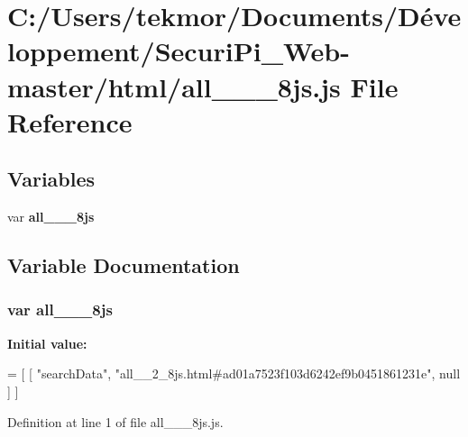 \section{C\+:/\+Users/tekmor/\+Documents/\+Développement/\+Securi\+Pi\+\_\+\+Web-\/master/html/all\+\_\+\+\_\+\_\+8js.js File Reference}
\label{all____2__8js_8js}
\subsection*{Variables}
\begin{DoxyCompactItemize}
\item 
var {\bf all\+\_\+\+\_\+\_\+8js}
\end{DoxyCompactItemize}


\subsection{Variable Documentation}
\subsubsection[{all\+\_\+\+\_\+2\+\_\+8js}]{\setlength{\rightskip}{0pt plus 5cm}var all\+\_\+\+\_\+\_\+8js}\label{all____2__8js_8js_a1931a55b1ef736d7c8f6e841ce1a5dd7}
{\bfseries Initial value\+:}
\begin{DoxyCode}
=
[
    [ \textcolor{stringliteral}{"searchData"}, \textcolor{stringliteral}{"all\_\_2\_8js.html#ad01a7523f103d6242ef9b0451861231e"}, null ]
]
\end{DoxyCode}


Definition at line 1 of file all\+\_\+\+\_\+\_\+8js.\+js.

